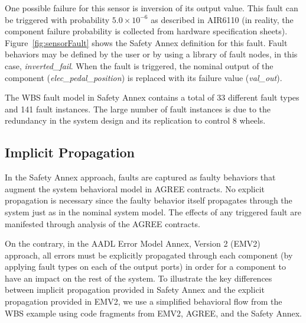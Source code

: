 One possible failure for this sensor is inversion of its output value. This fault can be triggered with probability $5.0\times 10^{-6}$ as described in AIR6110 (in reality, the component failure probability is 
collected from hardware specification sheets).  Figure~\ref{fig:sensorFault} shows the Safety Annex definition for this fault. Fault behaviors may be defined by the user or by using a library of fault nodes, in this case, \textit{inverted\_fail}.  When the fault is triggered, the nominal output of the component (\textit{elec\_pedal\_position}) is replaced with its failure value (\textit{val\_out}). 

The WBS fault model in Safety Annex contains a total of 33 different fault types and 141 fault instances. The large number of fault instances is due to the redundancy in the system design and its replication to control 8 wheels.

\subsection{Implicit %
	 Propagation}
In the Safety Annex approach, faults are captured as faulty behaviors that augment the system behavioral model in AGREE contracts. No explicit %
 propagation is necessary since the faulty behavior itself propagates through the system just as in the nominal system model. The effects of any triggered fault are manifested through analysis of the AGREE contracts. 

On the contrary, in the AADL Error Model Annex, Version 2 (EMV2)~\cite{EMV2} approach, all errors must be explicitly propagated through each component (by applying fault types on each of the output ports) in order for a component to have an impact on the rest of the system. To illustrate the key differences between implicit %
 propagation provided in Safety Annex and the explicit %
 propagation provided in EMV2, we use a simplified behavioral flow from the WBS example using code fragments from EMV2, AGREE, and the Safety Annex. 

